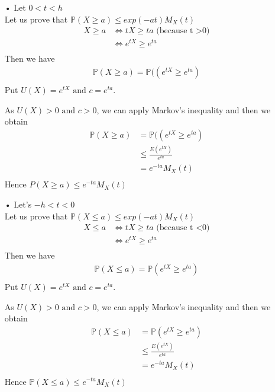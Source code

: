 \documentclass[11pt]{article}
\def\gt{>}
\def\lt{<}
\begin{document}
\begin{itemize}
\item[•] Let $ 0 \lt t \lt h$\\
Let us prove that $\mathbb {P}(X \geq a) \leq  exp(-at)M_X(t)$
\begin{align*}
X \ge a &\iff tX \ge ta \text{ (because t \gt 0)} \\
        &\iff e^{tX} \ge e^{ta} \\
\end{align*}
Then we have
\begin{align*}
\mathbb {P}(X \geq a) =\mathbb {P}((e^{tX} \ge e^{ta}) \\
\end{align*}
Put $U(X)=e^{tX} \text{ and }c=e^{ta} $.

As $U(X) \gt 0 \text{ and } c\gt 0$, we can apply Markov's inequality and then we obtain
\begin{align*}
\mathbb {P}(X \geq a) &=\mathbb {P}((e^{tX} \ge e^{ta}) \\
            &\leq \frac{E(e^{tX})}{e^{ta}}  \\
            &= e^{-ta}M_X(t)  \\
\end{align*}
Hence $P(X \geq a) \leq e^{-ta}M_X(t)$


\item[•] Let's  $ -h\lt t \lt 0 $\\
Let us prove that $\mathbb {P}(X \leq a) \leq  exp(-at)M_X(t)$
\begin{align*}
X \le a &\iff tX \ge ta \text{ (because t \lt 0)} \\
        &\iff e^{tX} \ge e^{ta} \\
\end{align*}
Then we have
\begin{align*}
\mathbb {P}(X \leq a) =\mathbb {P}(e^{tX} \ge e^{ta}) \\
\end{align*}
Put $U(X)=e^{tX} \text{ and }c=e^{ta} $.

As $U(X) \gt 0 \text{ and } c\gt 0$, we can apply Markov's inequality and then we obtain
\begin{align*}
\mathbb {P}(X \leq a) &=\mathbb {P}(e^{tX} \ge e^{ta}) \\
            &\leq \frac{E(e^{tX})}{e^{ta}}  \\
            &= e^{-ta}M_X(t)  \\
\end{align*}
Hence $\mathbb {P}(X \leq a) \leq e^{-ta}M_X(t)$
\end{itemize}
\end{document}
